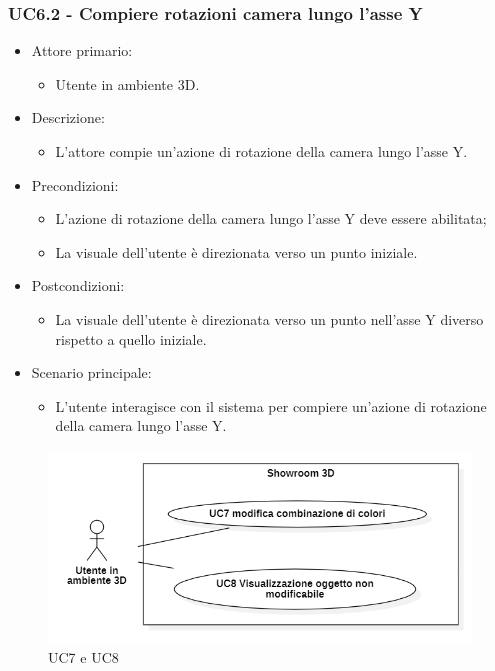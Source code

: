 \subsubsection{UC6.2 - Compiere rotazioni camera lungo l'asse Y}
\begin{itemize}

	\item Attore primario: 
	\begin{itemize}
		\item Utente in ambiente 3D.
	\end{itemize}
	\item Descrizione:
	\begin{itemize}
		\item L'attore compie un'azione di rotazione della camera lungo l'asse Y.
	\end{itemize}
	
	\item Precondizioni:
	\begin{itemize}
		\item L'azione di rotazione della camera lungo l'asse Y deve essere abilitata;
		\item La visuale dell'utente è direzionata verso un punto iniziale.
	\end{itemize}
	
	\item Postcondizioni:
	\begin{itemize}
		\item La visuale dell'utente è direzionata verso un punto nell'asse Y diverso rispetto a quello iniziale.
	\end{itemize}
	
	\item Scenario principale:
	\begin{itemize}
		\item L'utente interagisce con il sistema per compiere un'azione di rotazione della camera lungo l'asse Y.
	\end{itemize}
	
\end{itemize}

\pagebreak

\begin{figure}[H]
  \renewcommand{\thefigure}{8}
  \includegraphics[width=\linewidth]{./res/images/UC7-8.png}
  \caption{UC7 e UC8}
  \label{fig:UC 7-8}
\end{figure}


